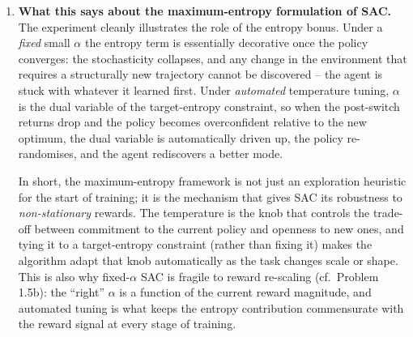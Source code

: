 \documentclass[12pt]{scrartcl}
\begin{document}
\begin{enumerate}
\begin{enumerate}[label=(\alph*)]
        The qualitative gap is exactly what one would predict from the entropy: at $\alpha=0.01$ the policy has already collapsed to a near-deterministic ``go-through-the-box'' trajectory by $250$K and there is essentially no exploration left to discover the alternative deflected path; under auto-$\alpha$ the temperature is automatically re-raised when the post-switch returns drop, exploration is restored, and the policy can reorganise around the new reward landscape.

        \item \textbf{What this says about the maximum-entropy formulation of SAC.}
        The experiment cleanly illustrates the role of the entropy bonus. Under a \emph{fixed} small $\alpha$ the entropy term is essentially decorative once the policy converges: the stochasticity collapses, and any change in the environment that requires a structurally new trajectory cannot be discovered -- the agent is stuck with whatever it learned first. Under \emph{automated} temperature tuning, $\alpha$ is the dual variable of the target-entropy constraint, so when the post-switch returns drop and the policy becomes overconfident relative to the new optimum, the dual variable is automatically driven up, the policy re-randomises, and the agent rediscovers a better mode.

        In short, the maximum-entropy framework is not just an exploration heuristic for the start of training; it is the mechanism that gives SAC its robustness to \emph{non-stationary} rewards. The temperature is the knob that controls the trade-off between commitment to the current policy and openness to new ones, and tying it to a target-entropy constraint (rather than fixing it) makes the algorithm adapt that knob automatically as the task changes scale or shape. This is also why fixed-$\alpha$ SAC is fragile to reward re-scaling (cf.\ Problem 1.5b): the ``right'' $\alpha$ is a function of the current reward magnitude, and automated tuning is what keeps the entropy contribution commensurate with the reward signal at every stage of training.
    \end{enumerate}


\end{enumerate}
\end{document}
